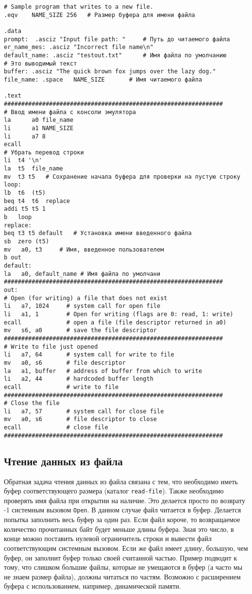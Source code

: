 \begin{verbatim}
# Sample program that writes to a new file.
.eqv	NAME_SIZE 256	# Размер буфера для имени файла

.data
prompt:  .asciz "Input file path: "     # Путь до читаемого файла
er_name_mes: .asciz "Incorrect file name\n"
default_name: .asciz "testout.txt"      # Имя файла по умолчанию
# Это выводимый текст
buffer: .asciz "The quick brown fox jumps over the lazy dog."
file_name: .space	NAME_SIZE		# Имя читаемого файла

.text
###############################################################
# Ввод имени файла с консоли эмулятора
la		a0 file_name
li      a1 NAME_SIZE
li      a7 8
ecall
# Убрать перевод строки
li  t4 '\n'
la  t5  file_name
mv  t3 t5	# Сохранение начала буфера для проверки на пустую строку
loop:
lb	t6  (t5)
beq t4	t6	replace
addi t5 t5 1
b   loop
replace:
beq t3 t5 default	# Установка имени введенного файла
sb  zero (t5)
mv   a0, t3 	# Имя, введенное пользователем
b out
default:
la   a0, default_name # Имя файла по умолчани
###############################################################
out:
# Open (for writing) a file that does not exist
li   a7, 1024     # system call for open file
li   a1, 1        # Open for writing (flags are 0: read, 1: write)
ecall             # open a file (file descriptor returned in a0)
mv   s6, a0       # save the file descriptor
###############################################################
# Write to file just opened
li   a7, 64       # system call for write to file
mv   a0, s6       # file descriptor
la   a1, buffer   # address of buffer from which to write
li   a2, 44       # hardcoded buffer length
ecall             # write to file
###############################################################
# Close the file
li   a7, 57       # system call for close file
mv   a0, s6       # file descriptor to close
ecall             # close file
###############################################################
\end{verbatim}


\subsection{Чтение данных из файла}

Обратная задача чтения данных из файла связана с тем, что необходимо иметь буфер соответствующего размера (каталог \verb|read-file|). Также необходимо проверять имя файла при открытии на наличие. Это делается просто по возврату -1 системным вызовом \verb|Open|. В данном случае файл читается в буфер. Делается попытка заполнить весь буфер за один раз. Если файл короче, то возвращаемое количество прочитанных байт будет меньше длины буфера. Зная это число, в конце можно поставить нулевой ограничитель строки и вывести файл соответствующим системным вызовом. Если же файл имеет длину, большую, чем буфер, он заполнит буфер только своей считанной частью. Пример подводит к тому, что слишком большие файлы, которые не умещаются в буфер (а часто мы не знаем размер файла), должны читаться по частям. Возможно с расширением буфера с использованием, например, динамической памяти.

